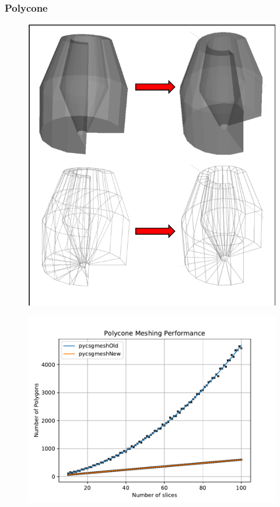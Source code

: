 \documentclass[12pt,a4paper]{article}
\begin{document}
\subsubsection{Polycone}
\begin{figure}[h!]
\centering
\begin{minipage}{.2\textwidth}
  \centering
  \includegraphics[height=1\linewidth]{Images//Meshes//polycone.png}
  \label{fig:test1}
\end{minipage}%
\begin{minipage}{.3\textwidth}
  \centering
  \includegraphics[scale=0.35]{Images//Quad_fits//Polycone_quad.pdf}
  \label{fig:test2}
\end{minipage}%
\end{figure}
\end{document}
